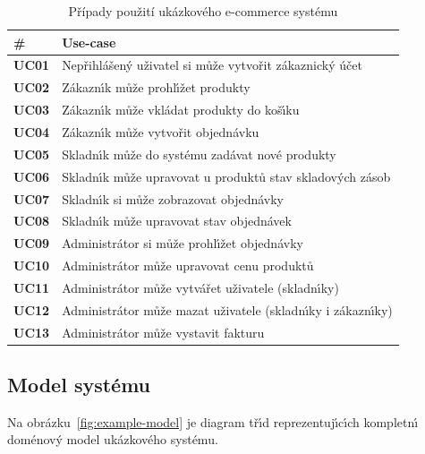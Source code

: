 \begin{table}[h]
    \centering
    \begin{tabular*}{\textwidth}{ l l }
        \hline
        \textbf{\#} & \textbf{Use-case} \\
        \hline \hline
        \textbf{UC01} & Nepřihlášen\'y uživatel si může vytvořit zákaznick\'y účet \\
        \textbf{UC02} & Zákazn\'{\i}k může prohl\'{\i}žet produkty \\
        \textbf{UC03} & Zákazn\'{\i}k může vkládat produkty do koš\'{\i}ku \\
        \textbf{UC04} & Zákazn\'{\i}k může vytvořit objednávku \\
        \textbf{UC05} & Skladn\'{\i}k může do systému zadávat nové produkty \\
        \textbf{UC06} & Skladn\'{\i}k může upravovat u produktů stav skladov\'ych zásob \\
        \textbf{UC07} & Skladn\'{\i}k si může zobrazovat objednávky \\
        \textbf{UC08} & Skladn\'{\i}k může upravovat stav objednávek \\
        \textbf{UC09} & Administrátor si může prohl\'{\i}žet objednávky \\
        \textbf{UC10} & Administrátor může upravovat cenu produktů \\
        \textbf{UC11} & Administrátor může vytvářet uživatele (skladn\'{\i}ky) \\
        \textbf{UC12} & Administrátor může mazat uživatele (skladn\'{\i}ky i zákazn\'{\i}ky) \\
        \textbf{UC13} & Administrátor může vystavit fakturu \\
        \hline
    \end{tabular*}
    \caption{Případy použití ukázkového e-commerce systému}
    \label{tbl:use-cases}
\end{table}

\subsection{Model systému}

Na obrázku~\ref{fig:example-model} je diagram tř\'{\i}d reprezentuj\'{\i}c\'{\i}ch
kompletn\'{\i} doménov\'y model ukázkového systému.

